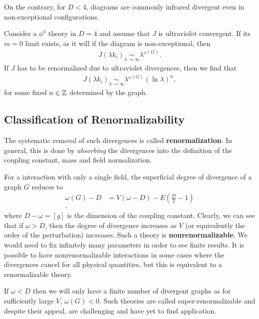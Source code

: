 On the contrary, for $D < 4$, diagrams are commonly infrared divergent even in non-exceptional configurations.

\begin{theorem}
    Consider a $\phi^{4}$ theory in $D = 4$ and assume that $J$ is ultraviolet convergent. If its $m = 0$ limit exists, as it will if the diagram is non-exceptional, then
    \begin{align*}
        J\left( \lambda k_i \right) \underset{\lambda \to \infty}{\sim} \lambda^{\omega \left( G \right) }
    .\end{align*}
    If $J$ has to be renormalized due to ultraviolet divergences, then we find that
    \begin{align*}
        J\left( \lambda k_i \right) \underset{\lambda \to \infty}{\sim} \lambda^{\omega \left( G \right) }\left( \ln \lambda \right)^{n}
    ,\end{align*}
    for some fixed $n \in \mathbb{Z}$ determined by the graph.
\end{theorem}

\subsection{Classification of Renormalizability}

The systematic removal of such divergences is called \textbf{renormalization}. In general, this is done by \textit{absorbing} the divergences into the definition of the coupling constant, mass and field normalization.

For a interaction with only a single field, the superficial degree of divergence of a graph $G$ reduces to
\begin{align*}
    \omega \left( G \right) - D &= V \left( \omega - D \right) - E \left( \frac{D}{2} - 1 \right)  \\
,\end{align*}
where $D - \omega = \left[ g \right] $ is the dimension of the coupling constant.
Clearly, we can see that if $\omega > D$, then the degree of divergence increases as $V$ (or equivalently the order of the perturbation) increases. Such a theory is \textbf{nonrenormalizable}. We would need to fix infinitely many parameters in order to see finite results. It is possible to have nonrenormalizable interactions in some cases where the divergences cancel for all physical quantities, but this is equivalent to a renormalizable theory.

If $\omega < D$ then we will only have a finite number of divergent graphs as for sufficiently large $V$, $\omega \left( G \right) < 0$. Such theories are called super-renormalizable and despite their appeal, are challenging and have yet to find application.

